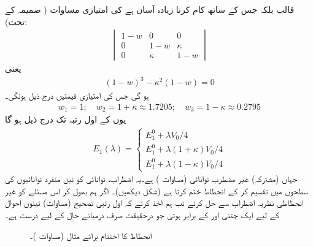 قالب  بلکہ  جس کے ساتھ کام کرنا زیادہ آسان ہے کی امتیازی مساوات ( ضمیمہ  کے تحت):
\begin{align*}
\begin{vmatrix}
1 - w & 0 & 0 \\
0 & 1 - w& \kappa \\
0 & \kappa & 1 - w
\end{vmatrix}
\end{align*}
یعنی
\begin{align*}
(1 - w)^3 - \kappa^2 (1 - w) = 0
\end{align*}
ہو گی جس کی امتیازی قیمتیں درج ذیل ہونگی۔ 
\begin{align*}
w_1 = 1; \quad w_2 = 1+ \kappa \approx 1.7205; \quad w_3 = 1 - \kappa \approx 0.2795
\end{align*}
یوں  کے اول رتبہ تک درج ذیل ہو گا 
\begin{align}\label{مساوات_غیر_مضطرب_توانائی_کعبی_کنواں}
E_1 (\lambda) = 
\begin{cases}
E_1^0 + \lambda V_0/4 \\
E_1^0 + \lambda (1+ \kappa) V_0 /4 \\
E_1^0 + \lambda (1 - \kappa) V_0 /4
\end{cases}
\end{align}
جہاں  (مشترکہ) غیر مضطرب توانائی (مساوات ) ہے۔یہ اضطراب، توانائی  کو تین منفرد توانائیوں کی سطحوں میں تقسیم کر کے انحطاط ختم کرتا ہے (شکل  دیکھیں)۔ اگر ہم بھول کر اس مسئلے کو غیر انحطاطی نظریہ اضطراب سے حل کرتے تب ہم اخذ کرتے کہ اول رتبی تصحیح (مساوات) تینوں احوال کے لیے ایک جتنی اور  کے برابر ہوتی جو درحقیقت صرف درمیانے حال کے لیے درست ہے۔

\begin{figure}
\centering
{}
\caption{انحطاط کا اختتام برائے مثال  (مساوات )۔}
\label{شکل_غیر_تابع_اضطراب_انحطاط_اختتام_مثال}
\end{figure}


